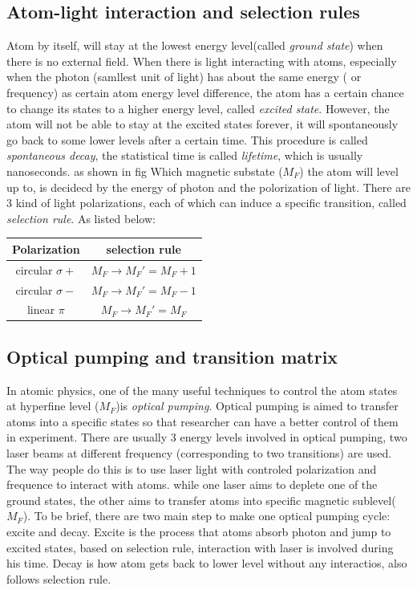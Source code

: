 \documentclass[a4paper, 10pt]{article}
\begin{document}
\subsection{Atom-light interaction and selection rules}
Atom by itself, will stay at the lowest energy level(called \textit{ground state}) when there is no external field. When there is light interacting with atoms, especially when the photon (samllest unit of light) has about the same energy ( or frequency) as certain atom energy level difference, the atom has a certain chance to change its states to a higher energy level, called \textit{excited state}. However, the atom will not be able to stay at the excited states forever, it will spontaneously go back to some lower levels after a certain time. This procedure is called \textit{spontaneous decay}, the statistical time is called \textit{lifetime}, which is usually nanoseconds. as shown in fig %
Which magnetic substate ($M_F$) the atom will level up to, is decidecd by the energy of photon and the polorization of light. There are 3 kind of light polarizations, each of which can induce a  specific transition, called \textit{selection rule}. As listed below:\\
\begin{center}
  \begin{tabular}{c|c}
    Polarization & selection rule \\ \hline
    circular $\sigma+$ & $M_F\rightarrow M_F\prime = M_F + 1$ \\ \hline
    circular $\sigma-$ & $M_F\rightarrow M_F\prime = M_F - 1$ \\ \hline
    linear $\pi$ & $M_F\rightarrow M_F\prime = M_F$
  \end{tabular}
\end{center}

\subsection{Optical pumping and transition matrix}
In atomic physics, one of the many useful techniques to control the atom states at hyperfine level ($M_F$)is \textit{optical pumping}. Optical pumping is aimed to transfer atoms into a specific states so that researcher can have a better control of them in experiment. There are usually 3 energy levels involved in optical pumping, two laser beams at different frequency (corresponding to two transitions) are used.  The way people do this is to use laser light with controled polarization and frequence to interact with atoms. while one laser aims to deplete one of the ground states, the other aims to transfer atoms into specific magnetic sublevel($M_F$). To be brief, there are two main step to make one optical pumping cycle: excite and decay. Excite is the process that atoms absorb photon and jump to excited states, based on selection rule, interaction with laser is involved  during his time. Decay is how atom gets back to lower level without any interactios, also follows selection rule.\\
\end{document}
